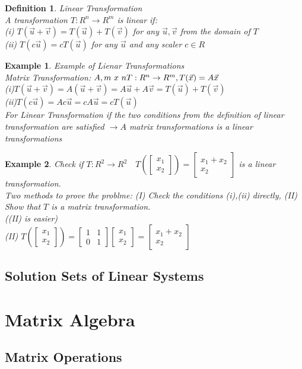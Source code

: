 \documentclass[a4paper,12pt,openany]{book}
\theoremstyle{defn}
\newtheorem{defn}{Definition}[section]
\theoremstyle{expl}
\newtheorem{expl}{Example}[section]
\begin{document}
\begin{defn}
\textup{
Linear Transformation\\
A transformation $T: R^n \rightarrow R^m$ is linear if:\\
(i) $T(\vec{u}+\vec{v})=T(\vec{u})+T(\vec{v})$ for any $\vec{u},\vec{v}$ from the domain of $T$\\
(ii) $T(c\vec{u})=cT(\vec{u})$ for any $\vec{u}$ and any scaler $c\in R$\\
}\end{defn}
\begin{expl} 
\textup{
Example of Lienar Transformations\\
Matrix Transformation: $A, m~x~n \\ T:R^n\rightarrow R^m, T(\vec{x})=A\vec{x}$\\
(i)$T(\vec{u}+\vec{v})=A(\vec{u}+\vec{v})=A\vec{u}+A\vec{v}=T(\vec{u})+T(\vec{v})$\\
(ii)$T(c\vec{u})=Ac\vec{u}=cA\vec{u}=cT(\vec{u})$\\
For Linear Transformation if the two conditions from the definition of linear transformation are satisfied $\rightarrow A$ matrix transformations is a linear transformations
}\end{expl}
\begin{expl}
\textup{
Check if $T:R^2\rightarrow R^2\quad T\left(\left[\begin{array}{c}x_1\\x_2\end{array}\right]\right)=\left[\begin{array}{c}x_1+x_2\\x_2\end{array}\right]$ is a linear transformation.\\
Two methods to prove the problme: (I) Check the conditions (i),(ii) directly, (II) Show that $T$ is a matrix transformation.\\((II) is easier)\\
(II) $T\left(\left[\begin{array}{c}x_1\\x_2\end{array}\right]\right)=\left[\begin{array}{cc}1&1\\0&1\end{array}\right]\left[\begin{array}{c}x_1\\x_2\end{array}\right]=\left[\begin{array}{c}x_1+x_2\\x_2\end{array}\right]$\\
}\end{expl}

\section{Solution Sets of Linear Systems}
\chapter{Matrix Algebra}
\section{Matrix Operations}
\end{document}
